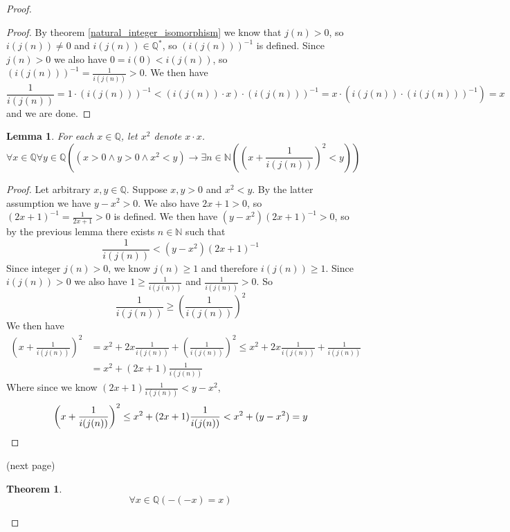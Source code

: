 \documentclass{report}
\newtheorem{theorem}[theo]{Theorem}
\newtheorem{lemma}[theo]{Lemma}
\begin{document}
\begin{proof}
\begin{proof}
By theorem \ref{natural_integer_isomorphism} we know that $j(n)>0$, so $i(j(n))\neq0$ and $i(j(n))\in\mathbb Q^*$, so $(i(j(n)))^{-1}$ is defined.
Since $j(n)>0$ we also have $0=i(0)<i(j(n))$, so $(i(j(n)))^{-1}=\frac{1}{i(j(n))}>0$.
We then have
\begin{equation*}
\frac{1}{i(j(n))}=1\cdot(i(j(n)))^{-1}<(i(j(n))\cdot x)\cdot(i(j(n)))^{-1}=x\cdot(i(j(n))\cdot(i(j(n)))^{-1})=x
\end{equation*}
and we are done.
\end{proof}
\begin{lemma}
For each $x\in\mathbb Q$, let $x^2$ denote $x\cdot x$. 
\begin{equation*}
\forall x\in\mathbb Q\forall y\in\mathbb Q
\left((x>0\land y>0\land x^2<y)\to\exists n\in\mathbb N\left(\left(x+\frac{1}{i(j(n))}\right)^2<y\right)\right)
\end{equation*}
\end{lemma}
\begin{proof}
Let arbitrary $x,y\in\mathbb Q$. Suppose $x,y>0$ and $x^2<y$.
By the latter assumption we have $y-x^2>0$. We also have
$2x+1>0$, so $(2x+1)^{-1}=\frac{1}{2x+1}>0$ is defined. We then have
$(y-x^2)(2x+1)^{-1}>0$, so by the previous lemma there exists $n\in\mathbb N$ such that 
\begin{equation*}
\frac{1}{i(j(n))}<(y-x^2)(2x+1)^{-1}
\end{equation*}
Since integer $j(n)>0$, we know $j(n)\geq1$ and therefore $i(j(n))\geq1$.
Since $i(j(n))>0$ we also have $1\geq\frac{1}{i(j(n))}$ and $\frac{1}{i(j(n))}>0$. So
\begin{equation*}
\frac{1}{i(j(n))}\geq\left(\frac{1}{i(j(n))}\right)^2
\end{equation*}
We then have
\begin{align*}
\left(x+\frac{1}{i(j(n))}\right)^2&=x^2+2x\frac{1}{i(j(n))}+\left(\frac{1}{i(j(n))}\right)^2\leq
x^2+2x\frac{1}{i(j(n))}+\frac{1}{i(j(n))}\\
&=x^2+(2x+1)\frac{1}{i(j(n))}
\end{align*}
Where since we know $(2x+1)\frac{1}{i(j(n))}<y-x^2$, 
\begin{equation*}
\left(x+\frac{1}{i(j(n))}\right)^2\leq x^2+(2x+1)\frac{1}{i(j(n))}
<x^2+(y-x^2)=y\qedhere
\end{equation*}
\end{proof}
\noindent(next page)\newpage
\begin{theorem}
\begin{equation*}
\forall x\in\mathbb Q(-(-x)=x)
\end{equation*}

\end{theorem}
\end{proof}
\end{document}

